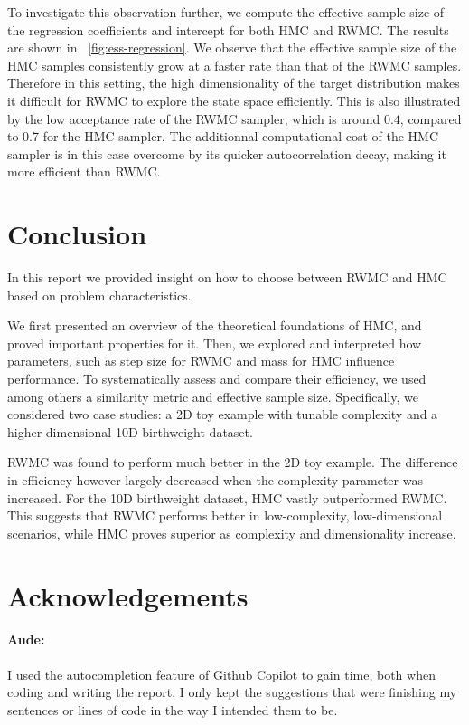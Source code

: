 \documentclass[a4paper, 12pt,oneside]{article}
\begin{document}
		To investigate this observation further, we compute the effective sample size of the regression coefficients and intercept for both HMC and RWMC. The results are shown in ~\ref{fig:ess-regression}. We observe that the effective sample size of the HMC samples consistently grow at a faster rate than that of the RWMC samples. Therefore in this setting, the high dimensionality of the target distribution makes it difficult for RWMC to explore the state space efficiently. This is also illustrated by the low acceptance rate of the RWMC sampler, which is around $0.4$, compared to 0.7 for the HMC sampler. The additionnal computational cost of the HMC sampler is in this case overcome by its quicker autocorrelation decay, making it more efficient than RWMC.
	\section{Conclusion}
	In this report we provided insight on how to choose between RWMC and HMC based on problem characteristics. 
	
	We first presented an overview of the theoretical foundations of HMC, and proved important properties for it.	
	Then, we explored and interpreted how parameters, such as step size for RWMC and mass for HMC influence performance. To systematically assess and compare their efficiency, we used among others a similarity metric and effective sample size. 
	Specifically, we considered two case studies: a 2D toy example with tunable complexity and a higher-dimensional 10D birthweight dataset. 
	
	RWMC was found to perform much better in the 2D toy example. The difference in efficiency however largely decreased when the complexity parameter was increased. For the 10D birthweight dataset, HMC vastly outperformed RWMC.  
	This suggests that RWMC performs better in low-complexity, low-dimensional scenarios, while HMC proves superior as complexity and dimensionality increase.
	\newpage
	\section*{Acknowledgements}
		\paragraph{Aude:}
		I used the autocompletion feature of Github Copilot to gain time, both when coding and writing the report. I only kept the suggestions that were finishing my sentences or lines of code in the way I intended them to be.
\end{document}
